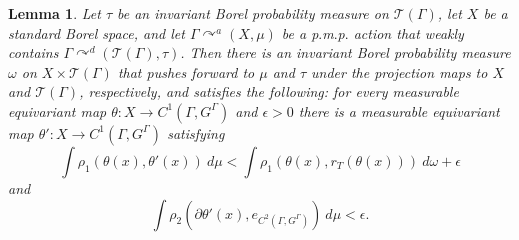 \documentclass[12pt]{amsart}
\newtheorem{lem}[thm]{Lemma}
\theoremstyle{definition}
\def\cal{\mathcal}
\newcommand{\pmp}{p{$.$}m{$.$}p{$.$}}
\newcommand{\acts}{\curvearrowright}
\begin{document}
\begin{lem} \label{lem:weaklift}
	Let $\tau$ be an invariant Borel probability measure on $\cal T(\Gamma)$, let $X$ be a standard Borel space, and let $\Gamma \acts^a (X, \mu)$ be a {\pmp} action that weakly contains $\Gamma \acts^d (\cal T(\Gamma), \tau)$. Then there is an invariant Borel probability measure $\omega$ on $X \times \cal T(\Gamma)$ that pushes forward to $\mu$ and $\tau$ under the projection maps to $X$ and $\cal T(\Gamma)$, respectively,
	and satisfies the following:
	for every measurable equivariant map $\theta : X \rightarrow C^1(\Gamma, G^\Gamma)$ and $\epsilon > 0$ there is a measurable equivariant map $\theta' : X \rightarrow C^1(\Gamma, G^\Gamma)$ satisfying
	\[\int \rho_1(\theta(x), \theta'(x)) \ d \mu < \int \rho_1(\theta(x), r_T(\theta(x))) \ d \omega + \epsilon\]
	and
	\[\int \rho_2( \partial \theta'(x), e_{C^2(\Gamma, G^\Gamma)}) \ d \mu < \epsilon.\]
\end{lem}
\end{document}
